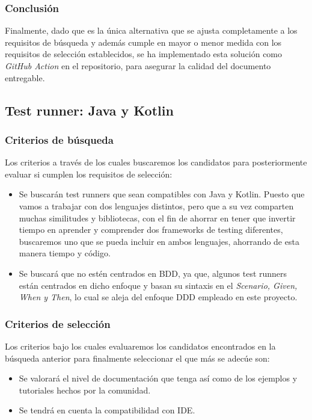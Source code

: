\subsubsection{Conclusión}
Finalmente, dado que es la única alternativa que se ajusta completamente a los
requisitos de búsqueda y además cumple en mayor o menor medida con los
requisitos de selección establecidos, se ha implementado esta solución como
\emph{GitHub Action} en el repositorio, para asegurar la calidad del documento
entregable.

\subsection{Test runner: Java y Kotlin}

\subsubsection{Criterios de búsqueda}

Los criterios a través de los cuales buscaremos los candidatos para
posteriormente evaluar si cumplen los requisitos de selección:
\begin{itemize}
    \item Se buscarán test runners que sean compatibles con Java y Kotlin.
    Puesto que vamos a trabajar con dos lenguajes distintos, pero que a su vez
    comparten muchas similitudes y bibliotecas, con el fin de ahorrar en tener
    que invertir tiempo en aprender y comprender dos frameworks de testing
    diferentes, buscaremos uno que se pueda incluir en ambos lenguajes,
    ahorrando de esta manera tiempo y código. 
    \item Se buscará que no estén centrados en BDD, ya que, algunos test runners
    están centrados en dicho enfoque y basan su sintaxis en el \emph{Scenario,
    Given, When y Then}, lo cual se aleja del enfoque DDD empleado en este proyecto.
\end{itemize}

\subsubsection{Criterios de selección}

Los criterios bajo los cuales evaluaremos los candidatos encontrados en la
búsqueda anterior para finalmente seleccionar el que más se adecúe son:
\begin{itemize}
    \item Se valorará el nivel de documentación que tenga así como de los
    ejemplos y tutoriales hechos por la comunidad.
    \item Se tendrá en cuenta la compatibilidad con IDE.
\end{itemize}


